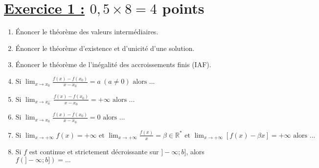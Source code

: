 \documentclass[12pt,a4paper]{article}
\begin{document}
\renewcommand{\arraystretch}{1.5}
\renewcommand{\arrayrulewidth}{1.2pt}
\vspace{3cm}

\section*{\underline{Exercice 1 :} $0,5 \times 8 = 4$ points}
\begin{enumerate}
\item Énoncer le théorème des valeurs intermédiaires.
\item Énoncer le théorème d’existence et d’unicité d’une solution.
\item Énoncer le théorème de l’inégalité des accroissements finis (IAF).
\item \(\text{Si }\lim_{x \to x_0} \frac{f(x) - f(x_0)}{x - x_0} = a \ (a \neq 0) \text{ alors ... }\)
\item \(\text{Si }\lim_{x \to x_0^-} \frac{f(x) - f(x_0)}{x - x_0} = +\infty \text{ alors ... }\)
\item \(\text{Si }\lim_{x \to x_0} \frac{f(x) - f(x_0)}{x - x_0} = 0 \text{ alors ... }\)
\item \(\text{Si }\lim_{x \to +\infty} f(x) =+\infty \text{ et }\lim_{x \to +\infty}\frac{f(x)}{x}=\beta \in\mathbb{R}^{*}\text{ et }\lim_{x \to +\infty}[f(x)-\beta x]=+\infty\text{ alors ...}\)
\item Si \(f\) est continue et strictement décroissante sur \( ]-\infty; b] \), alors \( f(]-\infty; b]) = ... \)
\end{enumerate}
\end{document}
